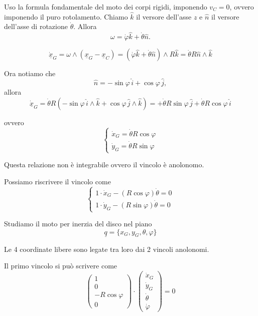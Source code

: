 \begin{example}{}
\begin{center}
\end{center}


Uso la formula fondamentale del moto dei corpi rigidi, imponendo \(v_C=0\),
ovvero imponendo il puro rotolamento. Chiamo \(\hat{k}\) il versore
dell'asse \(z\) e \(\hat{n}\) il versore dell'asse di rotazione
\(\dot{\theta}\). Allora
\[
\omega=\dot{\varphi}\hat{k}+\dot{\theta}\hat{n}.
\]

\[
\dot{\underline{x}}_G
=
\omega \wedge (\underline{x}_G-\underline{x}_C)
=
(\dot{\varphi}\hat{k}+\dot{\theta}\hat{n})\wedge R\hat{k}
=
\dot{\theta}R\hat{n}\wedge\hat{k}
\]

Ora notiamo che
\[
\hat{n}=-\sin\varphi\,\hat{i}+\cos\varphi\,\hat{j},
\]
allora
\[
\dot{\underline{x}}_G
=
\dot{\theta}R
\left(
-\sin\varphi\,\hat{i}\wedge\hat{k}
+
\cos\varphi\,\hat{j}\wedge\hat{k}
\right)
=
+\dot{\theta}R\sin\varphi\,\hat{j}
+
\dot{\theta}R\cos\varphi\,\hat{i}
\]

ovvero
\[
\begin{cases}
\dot{x}_G=\dot{\theta}R\cos\varphi\\
\dot{y}_G=\dot{\theta}R\sin\varphi
\end{cases}
\]

Questa relazione non è integrabile ovvero il vincolo è anolonomo.

Possiamo riscrivere il vincolo come
\[
\begin{cases}
1\cdot \dot{x}_G-(R\cos\varphi)\dot{\theta}=0\\
1\cdot \dot{y}_G-(R\sin\varphi)\dot{\theta}=0
\end{cases}
\]

Studiamo il moto per inerzia del disco nel piano
\[
\underline{q}=\{x_G,y_G,\theta,\varphi\}
\]

Le 4 coordinate libere sono legate tra loro dai 2 vincoli anolonomi.

Il primo vincolo si può scrivere come
\[
\begin{pmatrix}
1\\
0\\
-R\cos\varphi\\
0
\end{pmatrix}
\cdot
\begin{pmatrix}
\dot{x}_G\\
\dot{y}_G\\
\dot{\theta}\\
\dot{\varphi}
\end{pmatrix}
=0
\]


\end{example}
